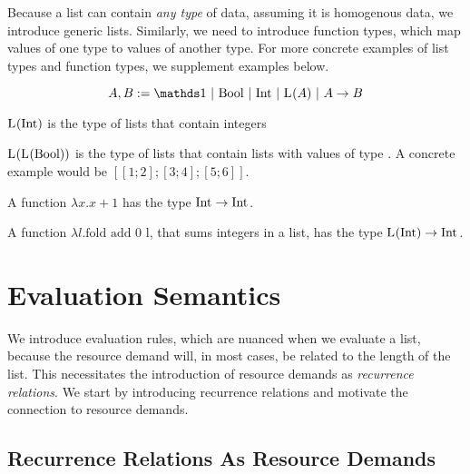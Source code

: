 Because a list can contain \emph{any type} of data, assuming it is homogenous data, we introduce generic lists. Similarly, we need to introduce function types, which map values of one type to values of another type. For more concrete examples of list types and function types, we supplement examples below.

\begin{definition}\label{def:type-system-6}
   \[
      A, B := \unit~|~\text{\bool}~|~\text{\typeint}~|~\ralist{}{A}~|~\rafunc{A}{B}{}{}
   \]
\end{definition}

\begin{example}
   \(\text{L}^{}(\text{Int})\) is the type of lists that contain integers
\end{example}

\begin{example}
   \(\text{L}^{}(\text{L}^{}(\text{Bool}))\) is the type of lists that contain lists with values of type \bool. A concrete example would be \([[1;2];[3;4];[5;6]]\).
\end{example}

\begin{example}
   A function \(\lambda x.x+1\) has the type \(\text{Int} \to \text{Int} ^{}_{}\).
\end{example}

\begin{example}
   A function \(\lambda l. \text{fold add  0  l}\), that sums integers in a list, has the type \(\text{L}^{}(\text{Int}) \to \text{Int} ^{}_{}\).
\end{example}



\section{Evaluation Semantics}

We introduce evaluation rules, which are nuanced when we evaluate a list, because the resource demand will, in most cases, be related to the length of the list. This necessitates the introduction of resource demands as \emph{recurrence relations}. We start by introducing recurrence relations and motivate the connection to resource demands. 

\subsection{Recurrence Relations As Resource Demands}

